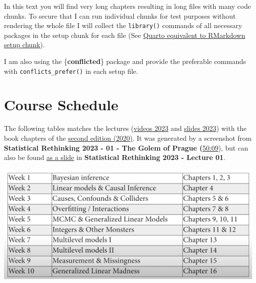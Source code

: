 \documentclass[
  letterpaper,
  DIV=11,
  numbers=noendperiod]{scrreprt}
\begin{document}

In this text you will find very long chapters resulting in long files
with many code chunks. To secure that I can run individual chunks for
test purposes without rendering the whole file I will collect the
\texttt{library()} commands of all necessary packages in the setup chunk
for each file (See
\href{https://community.rstudio.com/t/quarto-equivalent-to-rmarkdown-setup-chunk/153018}{Quarto
equivalent to RMarkdown setup chunk}).

I am also using the \{\textbf{conflicted}\} package and provide the
preferable commands with \texttt{conflicts\_prefer()} in each setup
file.

\hypertarget{course-schedule}{%
\section*{Course Schedule}\label{course-schedule}}


The following tables matches the lectures
(\href{https://www.youtube.com/playlist?list=PLDcUM9US4XdPz-KxHM4XHt7uUVGWWVSus}{videos
2023} and \href{https://speakerdeck.com/rmcelreath}{slides 2023}) with
the book chapters of the
\href{https://www.amazon.de/Statistical-Rethinking-Bayesian-Examples-Chapman/dp/036713991X/ref=pd_ci_mcx_mh_mcx_views_0?pd_rd_w=0hXcF&content-id=amzn1.sym.0cbf7d14-5630-4ffd-8c03-015d34863840&pf_rd_p=0cbf7d14-5630-4ffd-8c03-015d34863840&pf_rd_r=K9KW83V635VKRVDS2J6S&pd_rd_wg=cRN8V&pd_rd_r=d2928c40-3fdf-4b68-a23b-6d7484f0e11c&pd_rd_i=036713991X}{second
edition (2020)}. It was generated by a screenshot from
\textbf{Statistical Rethinking 2023 - 01 - The Golem of Prague
(}\href{https://www.youtube.com/watch?v=FdnMWdICdRs&list=PLDcUM9US4XdPz-KxHM4XHt7uUVGWWVSus&index=1&t=50m9s}{50:09}),
but can also be found
\href{https://speakerdeck.com/rmcelreath/statistical-rethinking-2023-lecture-01?slide=63}{as
a slide} in \textbf{Statistical Rethinking 2023 - Lecture 01}.

\includegraphics{img/SR2-Course-Schedule-min.png}
\end{document}
